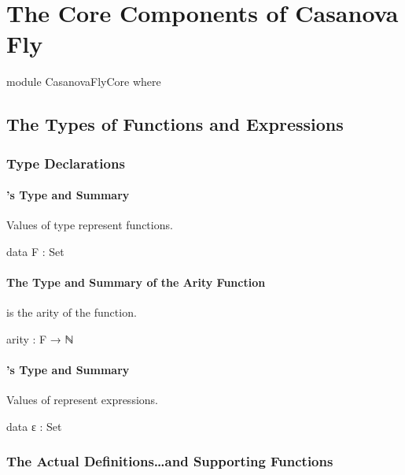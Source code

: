 \documentclass{report}
\begin{document}
\part{The Core Components of Casanova Fly}\label{sec:casanovaFlyCore}

\begin{code}
module CasanovaFlyCore where
\end{code}

\chapter{The Types of Functions and Expressions}

\section{Type Declarations}

\subsection{'s Type and Summary}
Values of type  represent functions.

\begin{code}
  data F : Set
\end{code}

\subsection{The Type and Summary of the Arity Function}
  is the arity of the  function.

\begin{code}
  arity : F → ℕ
\end{code}

\subsection{'s Type and Summary}
Values of  represent expressions.

\begin{code}
  data ε : Set
\end{code}

\section{The Actual Definitions\ldots and Supporting Functions}
\end{document}
